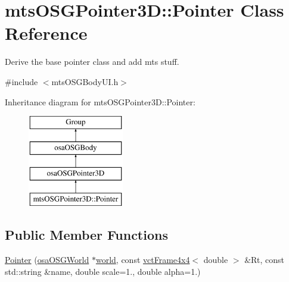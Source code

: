 \hypertarget{classmts_o_s_g_pointer3_d_1_1_pointer}{\section{mts\-O\-S\-G\-Pointer3\-D\-:\-:Pointer Class Reference}
\label{classmts_o_s_g_pointer3_d_1_1_pointer}
}


Derive the base pointer class and add mts stuff.  




{\ttfamily \#include $<$mts\-O\-S\-G\-Body\-U\-I.\-h$>$}

Inheritance diagram for mts\-O\-S\-G\-Pointer3\-D\-:\-:Pointer\-:\begin{figure}[H]
\begin{center}
\leavevmode
\includegraphics[height=4.000000cm]{df/db7/classmts_o_s_g_pointer3_d_1_1_pointer}
\end{center}
\end{figure}
\subsection*{Public Member Functions}
\begin{DoxyCompactItemize}
\item 
\hyperlink{classmts_o_s_g_pointer3_d_1_1_pointer_a541955da4a053da2e46f6dbf04a83e00}{Pointer} (\hyperlink{classosa_o_s_g_world}{osa\-O\-S\-G\-World} $\ast$\hyperlink{classosa_o_s_g_pointer3_d_a6576d36096a1c3a9127fbf9dbafee677}{world}, const \hyperlink{classvct_frame4x4}{vct\-Frame4x4}$<$ double $>$ \&Rt, const std\-::string \&name, double scale=1., double alpha=1.)
\end{DoxyCompactItemize}
